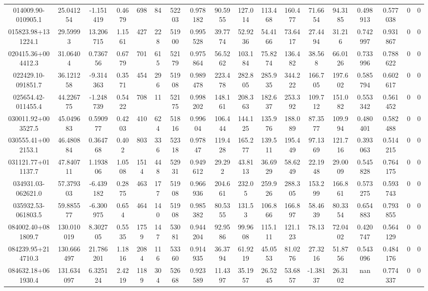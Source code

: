 \begin{table}
\begin{tabular}{cccccccccccccccccc}
014009.90-010905.1 & 25.041254 & -1.151419 & 0.4679 & 698 & 84 & 52203 & 0.978182 & 90.5955 & 127.014 & 113.468 & 160.477 & 71.6654 & 94.3185 & 0.498913 & 0.577038 & 0 & 0 \\
015823.98+131224.1 & 29.59993 & 13.206715 & 1.1561 & 427 & 228 & 51900 & 0.995528 & 39.7774 & 52.9236 & 54.4166 & 73.6417 & 27.4494 & 31.216 & 0.742997 & 0.931867 & 0 & 0 \\
020415.36+004412.3 & 31.06404 & 0.736756 & 0.6779 & 701 & 615 & 52179 & 0.975864 & 56.5262 & 103.184 & 75.8274 & 136.482 & 38.568 & 66.0126 & 0.733996 & 0.788622 & 0 & 0 \\
022429.10-091851.7 & 36.121258 & -9.314363 & 0.3571 & 454 & 296 & 51908 & 0.989478 & 223.478 & 282.805 & 285.935 & 344.222 & 166.705 & 197.602 & 0.585794 & 0.602617 & 0 & 0 \\
025654.42-011455.4 & 44.226775 & -1.248739 & 0.5422 & 708 & 11 & 52175 & 0.998202 & 148.161 & 208.363 & 182.637 & 253.392 & 109.712 & 151.082 & 0.553342 & 0.561452 & 0 & 0 \\
030011.92+003527.5 & 45.049683 & 0.590977 & 0.4203 & 410 & 624 & 51816 & 0.99604 & 106.444 & 144.125 & 135.976 & 188.089 & 87.3577 & 109.994 & 0.480401 & 0.582488 & 0 & 0 \\
030555.41+002153.1 & 46.480884 & 0.364768 & 0.402 & 803 & 336 & 52318 & 0.97847 & 119.428 & 165.277 & 139.511 & 195.449 & 97.1369 & 121.716 & 0.393063 & 0.514215 & 0 & 0 \\
031121.77+011137.7 & 47.840711 & 1.193806 & 1.0508 & 1514 & 448 & 52931 & 0.949612 & 29.292 & 43.8113 & 36.6929 & 58.6249 & 22.1948 & 29.0009 & 0.545828 & 0.764175 & 0 & 0 \\
034931.03-062621.0 & 57.379303 & -6.439182 & 0.2875 & 463 & 177 & 51908 & 0.966936 & 204.661 & 232.05 & 259.926 & 288.305 & 153.299 & 166.861 & 0.573275 & 0.593743 & 0 & 0 \\
035932.53-061803.5 & 59.885577 & -6.300975 & 0.654 & 464 & 140 & 51908 & 0.985382 & 80.5355 & 131.53 & 106.866 & 166.897 & 58.4639 & 80.3354 & 0.654883 & 0.793855 & 0 & 0 \\
084002.40+081809.7 & 130.010019 & 8.302705 & 0.5535 & 1759 & 147 & 53081 & 0.944204 & 92.9586 & 99.9608 & 115.111 & 121.123 & 78.13 & 72.0402 & 0.420747 & 0.564129 & 0 & 0 \\
084239.95+214710.3 & 130.666497 & 21.786201 & 1.1816 & 2084 & 116 & 53360 & 0.914935 & 36.3794 & 61.9219 & 45.0553 & 81.0276 & 27.3216 & 51.8756 & 0.543096 & 0.484176 & 0 & 0 \\
084632.18+061930.4 & 131.634097 & 6.325124 & 2.4219 & 1189 & 304 & 52668 & 0.923589 & 11.4397 & 35.1957 & 26.5245 & 53.6857 & -1.38137 & 26.3102 & nan & 0.774337 & 0 & 0 \\

\end{tabular}
\end{table}

